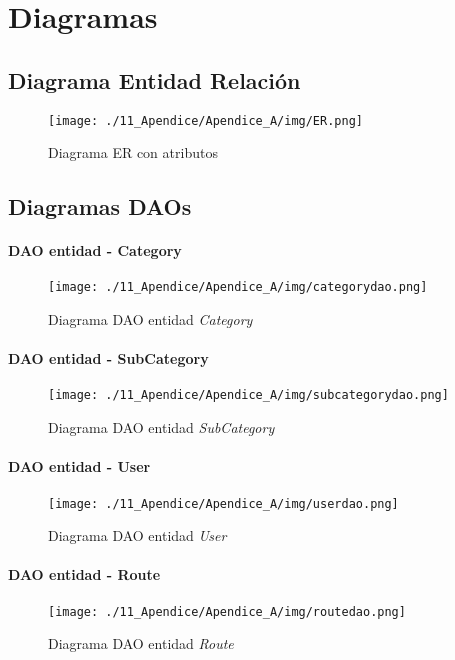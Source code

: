 \chapter[Diagramas]{
  \label{chp:diagramas}
  Diagramas
}
\thispagestyle{numberingStyle}
\pagestyle{numberingStyle}


\section{Diagrama Entidad Relación}
\FloatBarrier
\begin{sidewaysfigure}[]
\texttt{[image: ./11\_Apendice/Apendice\_A/img/ER.png]}
\caption{Diagrama ER con atributos}
\end{sidewaysfigure}



\newpage
\section{Diagramas DAOs}

\subsubsection*{DAO entidad - Category}
\begin{figure}[H]
\centering
\texttt{[image: ./11\_Apendice/Apendice\_A/img/categorydao.png]}
\caption{Diagrama DAO entidad \textit{Category}}
\end{figure}


\subsubsection*{DAO entidad - SubCategory}
\begin{figure}[H]
\centering
\texttt{[image: ./11\_Apendice/Apendice\_A/img/subcategorydao.png]}
\caption{Diagrama DAO entidad \textit{SubCategory}}
\end{figure}


\subsubsection*{DAO entidad - User}
\begin{figure}[H]
\centering
\texttt{[image: ./11\_Apendice/Apendice\_A/img/userdao.png]}
\caption{Diagrama DAO entidad \textit{User}}
\end{figure}


\subsubsection*{DAO entidad - Route}
\begin{figure}[H]
\centering
\texttt{[image: ./11\_Apendice/Apendice\_A/img/routedao.png]}
\caption{Diagrama DAO entidad \textit{Route}}
\end{figure}



